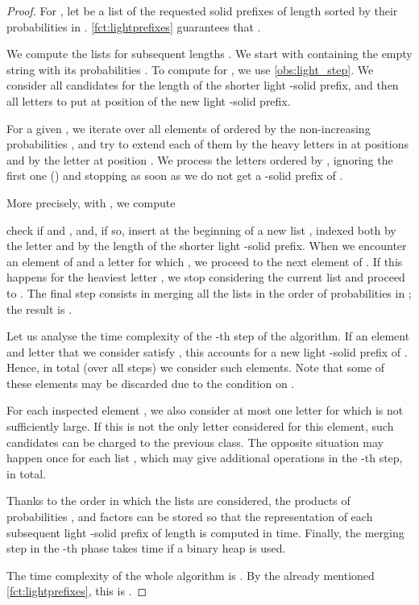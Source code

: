 \documentclass{article}
\theoremstyle{plain}
\theoremstyle{definition}
\newcommand{\frsq}{}
\newcommand{\mayqed}{}
\begin{document}
      \begin{proof}
        For , 
        let  be a list of the requested solid prefixes of length  sorted by their probabilities  in .
        \cref{fct:lightprefixes} guarantees that .
        
        We compute the lists  for subsequent lengths .
        We start with  containing the empty string with its probabilities .
        To compute  for , we use \cref{obs:light_step}.
        We consider all candidates  for the length of the shorter light -solid prefix,
        and then all letters  to put at position  of the new  light -solid prefix.
        
        For a given , we iterate over all elements  of  ordered by the non-increasing probabilities , 
        and try to extend each of them by the heavy letters in  at positions  and by the letter  at position .
        We process the letters  ordered by , ignoring the first one () and stopping as soon as we do not get a -solid prefix of . 
                
        More precisely, with , we compute
        
        check if  and , and, if so, insert
         at the beginning of a new list , indexed both by the letter 
        and by the length  of the shorter light -solid prefix.      
        When we encounter an element  of  and a letter  for which , we proceed to the next element of .
        If this happens for the heaviest letter , we stop considering the current list  and proceed to .
        The final step consists in merging all the  lists  in the order of probabilities in ;
        the result is .

        Let us analyse the time complexity of the -th step of the algorithm.
        If an element  and letter  that we consider satisfy , this accounts for a new light -solid prefix of .
        Hence, in total (over all steps) we consider  such elements.
        Note that some of these elements may be discarded due to the condition on .
        
        For each inspected element , we also consider at most one letter  for which  is not sufficiently large.
        If this is not the only letter considered for this element, such candidates can be charged to the previous class.
        The opposite situation may happen once for each list , which may give  additional operations in the -th step,
         in total.
        
        Thanks to the order in which the lists are considered, the products of probabilities
        ,  and factors  can be stored
        so that the representation of each subsequent light \frsq-solid prefix of length  is computed in  time.
        Finally, the merging step in the -th phase takes  time
        if a binary heap is used.

        The time complexity of the whole algorithm is .
        By the already mentioned \cref{fct:lightprefixes}, this is .
      \mayqed\end{proof}
\end{document}
